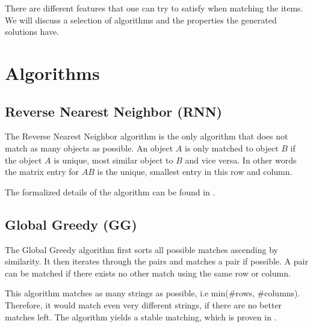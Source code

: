 \documentclass[a4paper,11pt]{article}
\begin{document}
There are different features that one can try to satisfy when matching the items. We will discuss a selection of algorithms and the properties the generated solutions have. 

\section{Algorithms}

\subsection{Reverse Nearest Neighbor (RNN)}

The Reverse Nearest Neighbor algorithm is the only algorithm that does not match as many objects as possible.
An object $A$ is only matched to object $B$ if the object $A$ is unique, most similar object to $B$ and vice versa. In other words the matrix entry for $AB$ is the unique, smallest entry in this row and column.

The formalized details of the algorithm can be found in \cite[p. 29]{rnn}.
  
\subsection{Global Greedy (GG)}

The Global Greedy algorithm first sorts all possible matches ascending by similarity. It then iterates through the pairs and matches a pair if possible. A pair can be matched if there exists no other match using the same row or column.

This algorithm matches as many strings as possible, i.e min(\#rows, \#columns). Therefore, it would match even very different strings, if there are no better matches left. The algorithm yields a stable matching, which is proven in \cite{augsten}.

\end{document}
